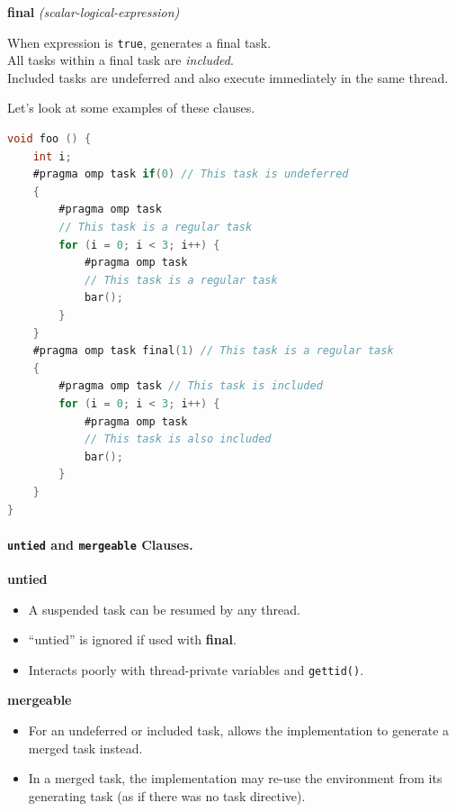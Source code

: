 \documentclass[a4paper]{report}
\begin{document}
  \begin{center}
  {\bf final} {\it(scalar-logical-expression)}
  \end{center}

    When expression is {\tt true}, generates a final task.\\
    All tasks within a final task are {\it included}.\\
    Included tasks are undeferred and also execute immediately in the same thread.

Let's look at some examples of these clauses.
  \begin{lstlisting}[language=C]
void foo () {
    int i;
    #pragma omp task if(0) // This task is undeferred
    {
        #pragma omp task
        // This task is a regular task
        for (i = 0; i < 3; i++) {
            #pragma omp task
            // This task is a regular task
            bar();
        }
    }
    #pragma omp task final(1) // This task is a regular task
    {
        #pragma omp task // This task is included
        for (i = 0; i < 3; i++) {
            #pragma omp task
            // This task is also included
            bar();
        }
    }
}
  \end{lstlisting}

\paragraph{{\tt untied} and {\tt mergeable} Clauses.}

\begin{center}
  {\bf untied}
\end{center}
  \begin{itemize}
    \item A suspended task can be resumed by any thread.
    \item ``untied'' is ignored if used with {\bf final}.
    \item Interacts poorly with thread-private variables and {\tt gettid()}.
  \end{itemize}

\begin{center}
  {\bf mergeable}
\end{center}

  \begin{itemize}
    \item For an undeferred or included task,
    allows the implementation to generate a merged task instead.
    \item In a merged task, the implementation may re-use the environment from its generating task (as if there was no task directive).
  \end{itemize}
\end{document}
